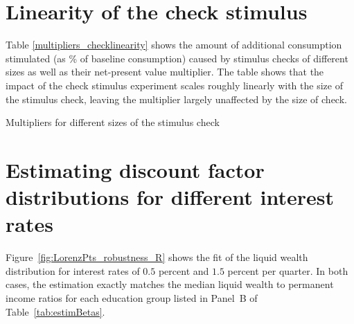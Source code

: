 \documentclass[../HAFiscal]{subfiles}
\begin{document}
\section{Linearity of the check stimulus}
\label{app:CheckMultiplier}

Table \ref{multipliers_checklinearity} shows the amount of additional consumption stimulated (as \% of baseline consumption) caused by stimulus checks of different sizes as well as their net-present value multiplier. The table shows that the impact of the check stimulus experiment scales roughly linearly with the size of the stimulus check, leaving the multiplier largely unaffected by the size of check.

\begin{table}[h] 
	\center
	
	\caption{Multipliers for different sizes of the stimulus check}
	\label{multipliers_checklinearity}
\end{table}

\section{Estimating discount factor distributions for different interest rates}
\label{app:DF_R}

Figure~\ref{fig:LorenzPts_robustness_R} shows the fit of the liquid wealth distribution for interest rates of $0.5$ percent and $1.5$ percent per quarter. In both cases, the estimation exactly matches the median liquid wealth to permanent income ratios for each education group listed in Panel~B of Table~\ref{tab:estimBetas}. 

\end{document}
